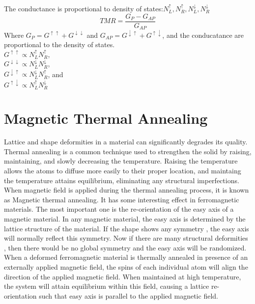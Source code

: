 \documentclass[12pt,a4paper,bold]{thesis}
\theoremstyle{thm}
\theoremstyle{definition}
\begin{document}
The conductance is proportional to density of states:$N_L^{\uparrow},N_R^{\uparrow},N_L^{\downarrow},N_R^{\downarrow}$\\
\[TMR=\frac{G_P-G_{AP}}{G_{AP}}\]
Where $G_P=G^{\uparrow \uparrow}+G^{\downarrow \downarrow}$ and $G_{AP}=G^{\downarrow \uparrow}+G^{\uparrow \downarrow}$, and the conducatance are proportional to the density of states.\\
$G^{\uparrow \uparrow} \propto N_L^{\uparrow}N_R^{\uparrow}$,\\
$G^{\downarrow \downarrow} \propto N_L^{\downarrow}N_R^{\downarrow}$,\\
$G^{\downarrow \uparrow} \propto N_L^{\downarrow}N_R^{\uparrow}$, and\\
$G^{\uparrow \downarrow} \propto N_L^{\uparrow}N_R^{\downarrow}$
\section{Magnetic Thermal Annealing}
Lattice and shape deformities in a material can significantly degrades its quality. Thermal annealing is a common technique used to strengthen the solid by raising, maintaining, and slowly decreasing the temperature. Raising the temperature allows the atoms to diffuse more easily to their proper location, and maintaing the temperature attains equilibrium, eliminating any structural imperfections.\\
When magnetic field is applied during the thermal annealing process, it is known as Magnetic thermal annealing. It has some interesting effect in ferromagnetic materials. The most important one is the re-orientation of the easy axis of a magnetic material. In any magnetic material, the easy axis is determined by the lattice structure of the material. If the shape shows any symmetry , the easy axis will normally reflect this symmetry. Now if there are many structural deformities , then there would be no global symmetry and the easy axis will be randomized.\\
When a deformed ferromagnetic material is thermally annealed in presence of an externally applied magnetic field, the spins of each individual atom will align the direction of the applied magnetic field. When maintained at high temperature, the system will attain equilibrium within this field, causing a lattice re-orientation such that easy axis is parallel to the applied magnetic field.
\end{document}
